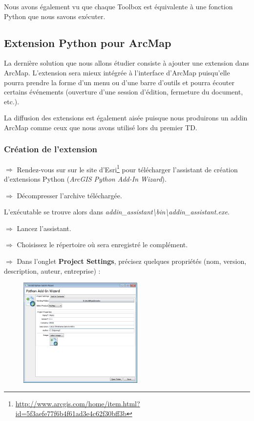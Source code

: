 \documentclass[11pt]{article}
\newcommand{\action}{$\Rightarrow$ }
\begin{document}
Nous avons également vu que chaque Toolbox est équivalente à une fonction Python que nous savons exécuter.


\subsection{Extension Python pour ArcMap}
La dernière solution que nous allons étudier consiste à ajouter une extension dans ArcMap. L'extension sera mieux intégrée à l'interface d'ArcMap puisqu'elle pourra prendre la forme d'un menu ou d'une barre d'outils et pourra écouter certains événements (ouverture d'une session d'édition, fermeture du document, etc.).

La diffusion des extensions est également aisée puisque nous produirons un addin ArcMap comme ceux que nous avons utilisé lors du premier TD.

\subsubsection{Création de l'extension}
\action Rendez-vous sur sur le site d'Esri\footnote{\url{http://www.arcgis.com/home/item.html?id=5f3aefe77f6b4f61ad3e4c62f30bff3b}} pour télécharger l'assistant de création d'extensions Python (\textit{ArcGIS Python Add-In Wizard}).

\action Décompresser l'archive téléchargée.

L'exécutable se trouve alors dans \textit{addin\_assistant\textbackslash{}bin\textbackslash{}addin\_assistant.exe}.

\action Lancez l'assistant.

\action Choisissez le répertoire où sera enregistré le complément.

\action Dans l'onglet \textbf{Project Settings}, précisez quelques propriétés (nom, version, description, auteur, entreprise) :
\begin{figure}[H]
	\center \includegraphics[width=0.55\textwidth]{img/td3/addin_assistant-1.png} \\
\end{figure}
\end{document}
